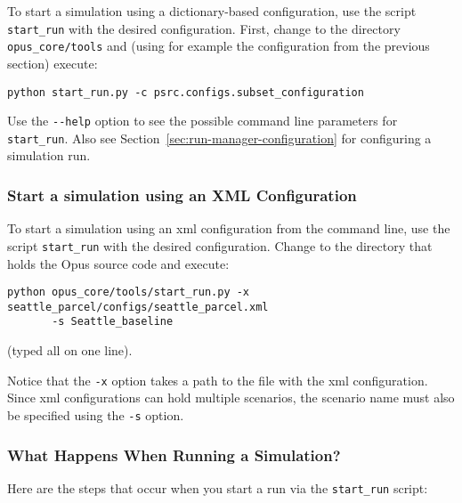 To start a simulation using a dictionary-based configuration, use the
script \verb|start_run| with the desired configuration. First, change to 
the directory \verb|opus_core/tools| and (using for example the configuration from the previous section) execute:
\begin{verbatim}
python start_run.py -c psrc.configs.subset_configuration
\end{verbatim}

Use the \verb|--help| option to see the
possible command line parameters for \verb|start_run|.
Also see Section~\ref{sec:run-manager-configuration} for 
configuring a simulation run.


\subsubsection{Start a simulation using an XML Configuration}
\label{sec:start-simulation-xml}

To start a simulation using an xml configuration from the command line, use
the script \verb|start_run| with the desired configuration.  Change to the
directory that holds the Opus source code and execute:
\begin{verbatim}
python opus_core/tools/start_run.py -x seattle_parcel/configs/seattle_parcel.xml 
       -s Seattle_baseline
\end{verbatim}
(typed all on one line).

Notice that the \verb|-x| option takes a path to the file with the xml
configuration.  Since xml configurations can hold multiple scenarios, the
scenario name must also be specified using the \verb|-s| option.

\subsubsection{What Happens When Running a Simulation?}
\label{sec:run-manager-tasks}
Here are the steps that occur when you start a run via the \verb|start_run|
script:

